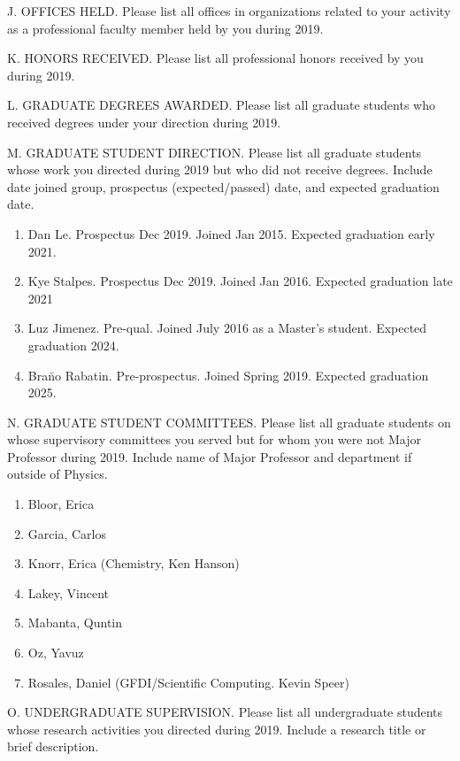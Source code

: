 \noindent J. OFFICES HELD. Please list all offices in organizations
related to your activity as a professional faculty member held by
you during 2019.
\bigskip

\noindent K. HONORS RECEIVED. Please list all professional honors
received by you during 2019.
\bigskip

\noindent L. GRADUATE DEGREES AWARDED. Please list all graduate
students who received degrees under your direction during 2019.
\bigskip

\noindent M. GRADUATE STUDENT DIRECTION. Please list all graduate
students whose work you directed during 2019 but who did not receive
degrees. Include date joined group, prospectus (expected/passed) date, 
and expected graduation date.
\bigskip
\begin{enumerate}
    \item Dan Le.  Prospectus Dec 2019.  Joined Jan 2015.  Expected graduation
        early 2021.
    \item Kye Stalpes.  Prospectus Dec 2019.  Joined Jan 2016.  Expected
        graduation late 2021
    \item Luz Jimenez.  Pre-qual.  Joined July 2016 as a Master's student.
        Expected graduation 2024.
    \item Bra\u{n}o Rabatin.  Pre-prospectus.  Joined Spring 2019.  Expected
        graduation 2025.
\end{enumerate}

\noindent N. GRADUATE STUDENT COMMITTEES. Please list all graduate
students on whose supervisory committees you served but for whom you
were not Major Professor during 2019.  Include name of Major Professor 
and department if outside of Physics.
\bigskip

\begin{enumerate}
    \item Bloor, Erica
    \item Garcia, Carlos
    \item Knorr, Erica (Chemistry, Ken Hanson)
    \item Lakey, Vincent
    \item Mabanta, Quntin
    \item Oz, Yavuz
    \item Rosales, Daniel (GFDI/Scientific Computing.  Kevin Speer)
\end{enumerate}

\noindent O. UNDERGRADUATE SUPERVISION. Please list all
undergraduate students whose research activities you directed during
2019.  Include a research title or brief description.
\bigskip

